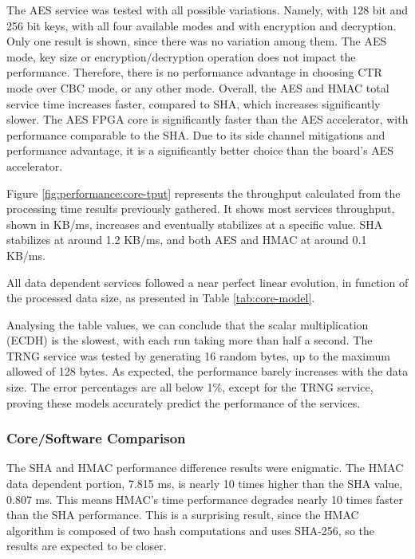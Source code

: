 The AES service was tested with all possible variations. Namely, with 128 bit and 256 bit keys, with all four available modes and with encryption and decryption. Only one result is shown, since there was no variation among them. The AES mode, key size or encryption/decryption operation does not impact the performance. Therefore, there is no performance advantage in choosing CTR mode over CBC mode, or any other mode.
Overall, the AES and HMAC total service time increases faster, compared to SHA, which increases significantly slower.
The AES FPGA core is significantly faster than the AES accelerator, with performance comparable to the SHA. Due to its side channel mitigations and performance advantage, it is a significantly better choice than the board's AES accelerator.

Figure \ref{fig:performance:core-tput} represents the throughput calculated from the processing time results previously gathered. It shows most services throughput, shown in KB/ms, increases and eventually stabilizes at a specific value. SHA stabilizes at around 1.2 KB/ms, and both AES and HMAC at around 0.1 KB/ms.

All data dependent services followed a near perfect linear evolution, in function of the processed data size, as presented in Table \ref{tab:core-model}.

Analysing the table values, we can conclude that the scalar multiplication (ECDH) is the slowest, with each run taking more than half a second.
The TRNG service was tested by generating 16 random bytes, up to the maximum allowed of 128 bytes. As expected, the performance barely increases with the data size.
The error percentages are all below 1\%, except for the TRNG service, proving these models accurately predict the performance of the services.

\subsubsection*{Core/Software Comparison}\label{chap:evaluation:services:software}

The SHA and HMAC performance difference results were enigmatic. The HMAC data dependent portion, 7.815 ms, is nearly 10 times higher than the SHA value, 0.807 ms. This means HMAC's time performance degrades nearly 10 times faster than the SHA performance. This is a surprising result, since the HMAC algorithm is composed of two hash computations and uses SHA-256, so the results are expected to be closer.

